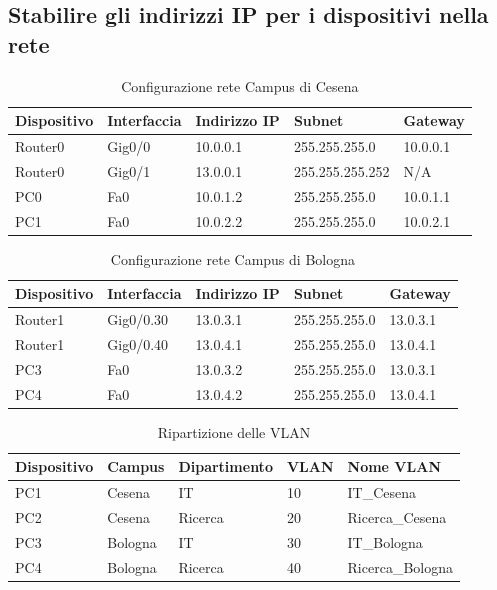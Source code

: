 \documentclass[a4paper,12pt]{report}
\begin{document}
\subsection{Stabilire gli indirizzi IP per i dispositivi nella rete}
\begin{table}[H]
\begin{tabular}{@{}lllll@{}}
\toprule
Dispositivo & Interfaccia & Indirizzo IP & Subnet & Gateway \\ \midrule
Router0 & Gig0/0 & 10.0.0.1 & 255.255.255.0 & 10.0.0.1 \\
Router0 & Gig0/1 & 13.0.0.1 & 255.255.255.252 & N/A \\
PC0 & Fa0 & 10.0.1.2 & 255.255.255.0 & 10.0.1.1 \\
PC1 & Fa0 & 10.0.2.2 & 255.255.255.0 & 10.0.2.1 \\ \bottomrule
\end{tabular}
\caption{Configurazione rete Campus di Cesena}
\label{table:config_cesena}
\end{table}
\begin{table}[H]
\begin{tabular}{lllll}
\hline
Dispositivo & Interfaccia & Indirizzo IP & Subnet & Gateway \\ \hline
Router1 & Gig0/0.30 & 13.0.3.1 & 255.255.255.0 & 13.0.3.1 \\
Router1 & Gig0/0.40 & 13.0.4.1 & 255.255.255.0 & 13.0.4.1 \\
PC3 & Fa0 & 13.0.3.2 & 255.255.255.0 & 13.0.3.1 \\
PC4 & Fa0 & 13.0.4.2 & 255.255.255.0 & 13.0.4.1 \\ \hline
\end{tabular}
\caption{Configurazione rete Campus di Bologna}
\label{table:config_bologna}
\end{table}
\begin{table}[H]
\begin{tabular}{@{}lllll@{}}
\toprule
Dispositivo & Campus & Dipartimento & VLAN & Nome VLAN \\ \midrule
PC1 & Cesena & IT & 10 & IT\_Cesena \\
PC2 & Cesena & Ricerca & 20 & Ricerca\_Cesena \\
PC3 & Bologna & IT & 30 & IT\_Bologna \\
PC4 & Bologna & Ricerca & 40 & Ricerca\_Bologna \\ \bottomrule
\end{tabular}
\caption{Ripartizione delle VLAN}
\label{table:vlan_division}
\end{table}
\end{document}
